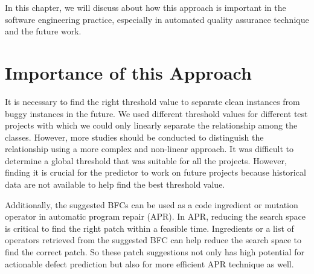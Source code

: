 In this chapter, we will discuss about how this approach is important in the software engineering practice, especially in automated quality assurance technique and the future work.

\section{Importance of this Approach}
It is necessary to find the right threshold value to separate clean instances from buggy instances in the future.
We used different threshold values for different test projects with which we could only linearly separate the relationship among the classes.
However, more studies should be conducted to distinguish the relationship using a more complex and non-linear approach.
It was difficult to determine a global threshold that was suitable for all the projects.
However, finding it is crucial for the predictor to work on future projects because historical data are not available to help find the best threshold value.

Additionally, the suggested BFCs can be used as a code ingredient or mutation operator in automatic program repair (APR).
In APR, reducing the search space is critical to find the right patch within a feasible time. Ingredients or a list of operators retrieved from the suggested BFC can help reduce the search space to find the correct patch.
So these patch suggestions not only has high potential for actionable defect prediction but also for more efficient APR technique as well.

